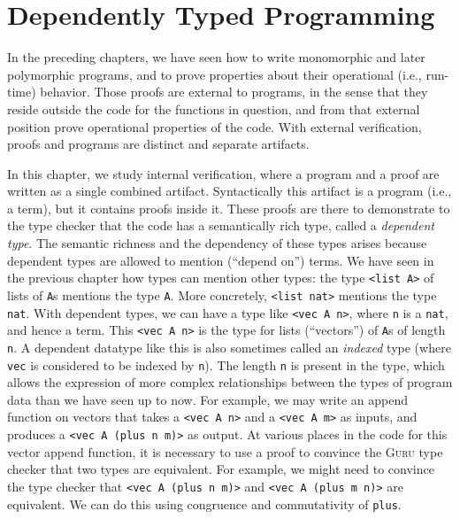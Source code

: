 \documentclass{book}[12pt]
\newcommand{\guru}[0]{\textsc{Guru}\xspace}
\begin{document}
\chapter{Dependently Typed Programming}

In the preceding chapters, we have seen how to write monomorphic and
later polymorphic programs, and to prove properties about their
operational (i.e., run-time) behavior.  Those proofs are external to
programs, in the sense that they reside outside the code for the
functions in question, and from that external position prove
operational properties of the code.  With external verification,
proofs and programs are distinct and separate artifacts.

In this chapter, we study internal verification, where a program and a
proof are written as a single combined artifact.  Syntactically this
artifact is a program (i.e., a term), but it contains proofs inside
it.  These proofs are there to demonstrate to the type checker that
the code has a semantically rich type, called a \emph{dependent type}.
The semantic richness and the dependency of these types arises because
dependent types are allowed to mention (``depend on'') terms.  We have
seen in the previous chapter how types can mention other types: the
type \texttt{<list A>} of lists of \texttt{A}s mentions the type
\texttt{A}.  More concretely, \texttt{<list nat>} mentions the type
\texttt{nat}.  With dependent types, we can have a type like
\texttt{<vec A n>}, where \texttt{n} is a \texttt{nat}, and hence a
term.  This \texttt{<vec A n>} is the type for lists (``vectors'') of
\texttt{A}s of length \texttt{n}.  A dependent datatype like this is
also sometimes called an \emph{indexed} type (where \texttt{vec} is
considered to be indexed by \texttt{n}).  The length \texttt{n} is
present in the type, which allows the expression of more complex
relationships between the types of program data than we have seen up
to now.  For example, we may write an append function on vectors that
takes a \texttt{<vec A n>} and a \texttt{<vec A m>} as inputs, and
produces a \texttt{<vec A (plus n m)>} as output.  At various places
in the code for this vector append function, it is necessary to use a
proof to convince the \guru type checker that two types are
equivalent.  For example, we might need to convince the type checker
that \texttt{<vec A (plus n m)>} and \texttt{<vec A (plus m n)>} are
equivalent.  We can do this using congruence and commutativity of
\texttt{plus}.
\end{document}
